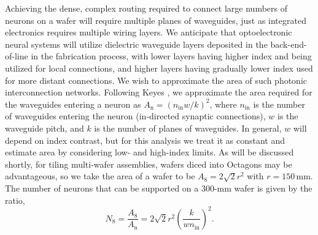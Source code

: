 \documentclass[twocolumn]{article}
\newenvironment{figure_alt}
  {\par\medskip\noindent\minipage{\linewidth}}
  {\endminipage\par\medskip}
\begin{document}
Achieving the dense, complex routing required to connect large numbers of neurons on a wafer will require multiple planes of waveguides, just as integrated electronics requires multiple wiring layers. We anticipate that optoelectronic neural systems will utilize dielectric waveguide layers deposited in the back-end-of-line in the fabrication process, with lower layers having higher index and being utilized for local connections, and higher layers having gradually lower index used for more distant connections. We wish to approximate the area of such photonic interconnection networks. Following Keyes \cite{ke1982}, we approximate the area required for the waveguides entering a neuron as $A_{\mathrm{n}} = (n_{\mathrm{in}} w/k)^2$, where $n_{\mathrm{in}}$ is the number of waveguides entering the neuron (in-directed synaptic connections), $w$ is the waveguide pitch, and $k$ is the number of planes of waveguides. In general, $w$ will depend on index contrast, but for this analysis we treat it as constant and estimate area by considering low- and high-index limits. As will be discussed shortly, for tiling multi-wafer assemblies, wafers diced into Octagons may be advantageous, so we take the area of a wafer to be $A_8 = 2\sqrt{2}r^2$ with $r = 150$\,mm. The number of neurons that can be supported on a 300-mm wafer is given by the ratio,
\begin{equation}
\label{eq:numNeuronPerWafer}
N_8 = \frac{A_8}{A_{\mathrm{n}}} = 2\sqrt{2}r^2\left(\frac{k}{wn_{\mathrm{in}}}\right)^2.
\end{equation}
\begin{figure}[] 
\end{figure}
\end{document}
